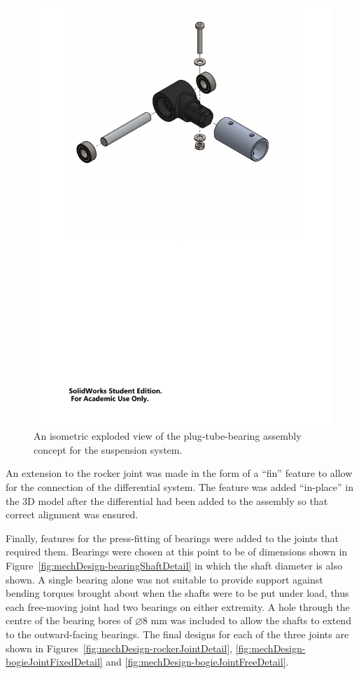         \begin{figure}[h!]
          \centering
          \includegraphics[clip, trim=2cm 17cm 2cm 1cm, width=0.8\linewidth]{figures/plug-tube-bearing}
          \caption[An isometric exploded view of the plug-tube-bearing assembly concept for the suspension system.]{An isometric exploded view of the plug-tube-bearing assembly concept for the suspension system.}
          \label{fig:mechDesign-plugTubeBearingDetail}
        \end{figure}        
        
        An extension to the rocker joint was made in the form of a ``fin'' feature to allow for the connection of the differential system. The feature was added ``in-place'' in the 3D model after the differential had been added to the assembly so that correct alignment was ensured.
        
        Finally, features for the press-fitting of bearings were added to the joints that required them. Bearings were chosen at this point to be of dimensions shown in Figure~\ref{fig:mechDesign-bearingShaftDetail} in which the shaft diameter is also shown. A single bearing alone was not suitable to provide support against bending torques brought about when the shafts were to be put under load, thus each free-moving joint had two bearings on either extremity. A hole through the centre of the bearing bores of $\diameter8$ mm was included to allow the shafts to extend to the outward-facing bearings. The final designs for each of the three joints are shown in Figures~\ref{fig:mechDesign-rockerJointDetail}, \ref{fig:mechDesign-bogieJointFixedDetail} and \ref{fig:mechDesign-bogieJointFreeDetail}.
        
